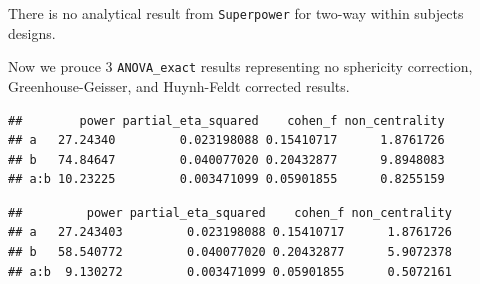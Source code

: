 \documentclass[
]{book}
\newenvironment{Shaded}{\begin{snugshade}}{\end{snugshade}}
\newcommand{\AttributeTok}[1]{\textcolor[rgb]{0.77,0.63,0.00}{#1}}
\newcommand{\CommentTok}[1]{\textcolor[rgb]{0.56,0.35,0.01}{\textit{#1}}}
\newcommand{\ConstantTok}[1]{\textcolor[rgb]{0.00,0.00,0.00}{#1}}
\newcommand{\FunctionTok}[1]{\textcolor[rgb]{0.00,0.00,0.00}{#1}}
\newcommand{\NormalTok}[1]{#1}
\newcommand{\OtherTok}[1]{\textcolor[rgb]{0.56,0.35,0.01}{#1}}
\newcommand{\SpecialCharTok}[1]{\textcolor[rgb]{0.00,0.00,0.00}{#1}}
\newcommand{\StringTok}[1]{\textcolor[rgb]{0.31,0.60,0.02}{#1}}
\begin{document}
There is no analytical result from \texttt{Superpower} for two-way within subjects designs.

Now we prouce 3 \texttt{ANOVA\_exact} results representing no sphericity correction, Greenhouse-Geisser, and Huynh-Feldt corrected results.

\begin{Shaded}
\end{Shaded}

\begin{verbatim}
##        power partial_eta_squared    cohen_f non_centrality
## a   27.24340         0.023198088 0.15410717      1.8761726
## b   74.84647         0.040077020 0.20432877      9.8948083
## a:b 10.23225         0.003471099 0.05901855      0.8255159
\end{verbatim}

\begin{Shaded}
\end{Shaded}

\begin{verbatim}
##         power partial_eta_squared    cohen_f non_centrality
## a   27.243403         0.023198088 0.15410717      1.8761726
## b   58.540772         0.040077020 0.20432877      5.9072378
## a:b  9.130272         0.003471099 0.05901855      0.5072161
\end{verbatim}

\begin{Shaded}
\end{Shaded}
\end{document}
